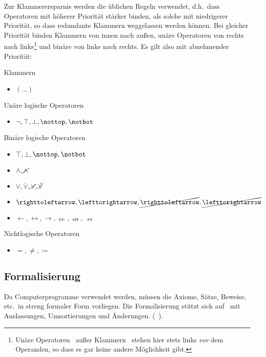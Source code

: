 \documentclass[english,ngerman,parskip=half,headsepline,footsepline]{scrreprt}
\makeatletter
\newcommand*{\lutrue}{\operatorname{\top}}      %
\newcommand*{\lnufalse}{\operatorname{\notbot}} %
\newcommand*{\lufalse}{\operatorname{\bot}}     %
\newcommand*{\lnutrue}{\operatorname{\nottop}}  %
\newcommand*{\lbtrue}{\operatorname{\top}}              %
\newcommand*{\lnbfalse}{\operatorname{\notbot}}         %
\newcommand*{\lnxor}{\operatorname{\cancel{\lxor}}}     %
\newcommand*{\lleftimp}{\operatorname{\leftarrow}}      %
\newcommand*{\lleft}{\operatorname{\righttoleftarrow}}  %
\newcommand*{\limp}{\operatorname{\rightarrow}}         %
\newcommand*{\lright}{\operatorname{\lefttorightarrow}} %
\newcommand*{\lequiv}{\operatorname{\leftrightarrow}}   %
\newcommand*{\lnand}{\operatorname{\cancel{\land}}}     %
\newcommand*{\lnequiv}{\operatorname{\nleftrightarrow}} %
\newcommand*{\lxor}{\operatorname{\dot{\lor}}}          %
\newcommand*{\lnright}{\operatorname{\cancel{\lright}}} %
\newcommand*{\lnimp}{\operatorname{\nrightarrow}}       %
\newcommand*{\lnleft}{\operatorname{\cancel{\lleft}}}   %
\newcommand*{\lnleftimp}{\operatorname{\nleftarrow}}    %
\newcommand*{\lnor}{\operatorname{\cancel{\lor}}}       %
\newcommand*{\lbfalse}{\operatorname{\bot}}             %
\newcommand*{\lnbtrue}{\operatorname{\nottop}    }      %
\newcommand*{\defeq}{\coloneqq}
\newcommand*{\textdh}{d.\@ h.\@}
\newcommand*{\textetc}{etc.\@}
\makeatother
\begin{document}
	Zur Klammerersparnis werden die üblichen Regeln verwendet, \textdh\ dass Operatoren mit höherer Priorität stärker binden, als solche mit niedrigerer Priorität, so dass redundante Klammern weggelassen werden können. Bei gleicher Priorität binden Klammern von innen nach außen, unäre Operatoren von rechts nach links\footnote{Unäre Operatoren \textendash\ außer Klammern \textendash\ stehen hier stets links \emph{vor} dem Operanden, so dass es gar keine andere Möglichkeit gibt.} und binäre von links nach rechts. Es gilt also mit abnehmender Priorität:

	Klammern
	\begin{itemize}
		\item $(\dots)$
	\end{itemize}
	Unäre logische Operatoren
	\begin{itemize}
		\item $\lnot, \lutrue, \lufalse, \lnutrue, \lnufalse$
	\end{itemize}
	Binäre logische Operatoren
	\begin{itemize}
		\item $\lbtrue, \lbfalse, \lnbtrue, \lnbfalse$
		\item $\land, \lnand$
		\item $\lor, \lxor, \lnor, \lnxor$
		\item $\lleft, \lright, \lnleft, \lnright$
		\item $\lleftimp, \lequiv, \limp, \lnleftimp, \lnequiv, \lnimp$
	\end{itemize}
	Nichtlogische Operatoren
	\begin{itemize}
		\item $=, \ne, \defeq$
	\end{itemize}

	\subsection{Formalisierung} %
	\label{sub:Formalisierung}

	Da Computerprogramme verwendet werden, müssen die Axiome, Sätze, Beweise, \textetc\ in streng formaler Form vorliegen. Die Formalisierung stützt sich auf~\cite{bib:Aussagenlogik} mit Auslassungen, Umsortierungen und Änderungen. (\alsoname~\cite{bib:LogikDe, bib:LogikEn}).
\end{document}
